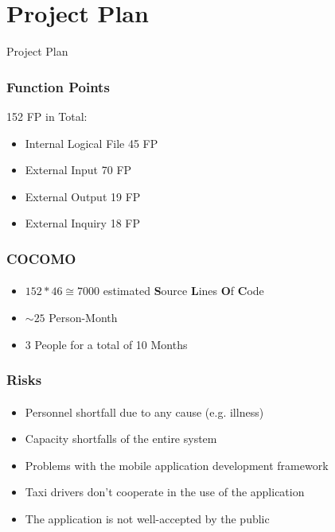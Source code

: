 \documentclass[10pt,xcolor={usenames,dvipsnames}]{beamer}
\begin{document}
\section[Section]{Project Plan}
\begin{frame}
	\begin{center}
		Project Plan
	\end{center}
\end{frame}
\begin{frame}
	\frametitle{Function Points}
	152 FP in Total:
	\begin{itemize}
		\item Internal Logical File 45 FP
		\item External Input 70 FP
		\item External Output 19 FP
		\item External Inquiry 18 FP
	\end{itemize}
\end{frame}
\begin{frame}
	\frametitle{COCOMO}
	\framesubtitle{}
	\begin{itemize}
		\item $152*46 \cong 7000$ estimated \textbf{S}ource \textbf{L}ines \textbf{O}f \textbf{C}ode
		\item $\sim 25$ Person-Month
		\item 3 People for a total of 10 Months
	\end{itemize}
\end{frame}
\begin{frame}
	\frametitle{Risks}
	\framesubtitle{}
	\begin{itemize}
		\item	Personnel shortfall due to any cause (e.g. illness)
		\item	Capacity shortfalls of the entire system
		\item	Problems with the mobile application development framework
		\item	Taxi drivers don't cooperate in the use of the application
		\item	The application is not well-accepted by the public
	\end{itemize}
\end{frame}
\end{document}
